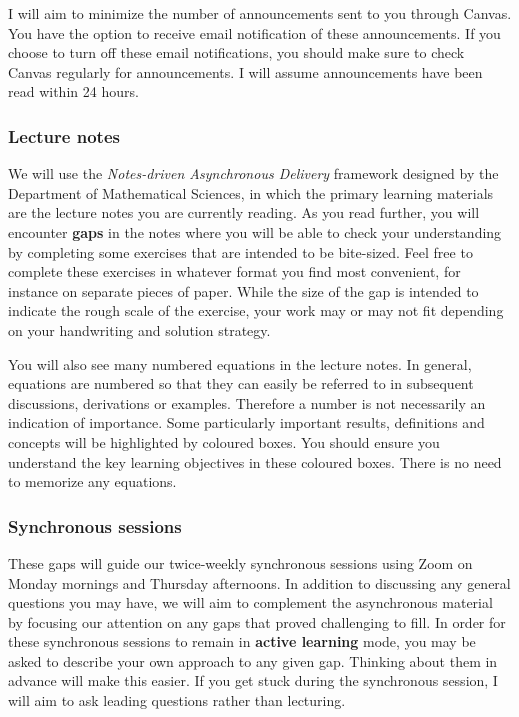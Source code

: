 I will aim to minimize the number of announcements sent to you through Canvas.
You have the option to receive email notification of these announcements.
If you choose to turn off these email notifications, you should make sure to check Canvas regularly for announcements.
I will assume announcements have been read within 24 hours.

\subsubsection*{Lecture notes}
We will use the \textit{Notes-driven Asynchronous Delivery} framework designed by the Department of Mathematical Sciences, in which the primary learning materials are the lecture notes you are currently reading.
As you read further, you will encounter \textbf{gaps} in the notes where you will be able to check your understanding by completing some exercises that are intended to be bite-sized.
Feel free to complete these exercises in whatever format you find most convenient, for instance on separate pieces of paper.
While the size of the gap is intended to indicate the rough scale of the exercise, your work may or may not fit depending on your handwriting and solution strategy.

You will also see many numbered equations in the lecture notes.
In general, equations are numbered so that they can easily be referred to in subsequent discussions, derivations or examples.
Therefore a number is not necessarily an indication of importance.
Some particularly important results, definitions and concepts will be highlighted by coloured boxes.
You should ensure you understand the key learning objectives in these coloured boxes.
There is no need to memorize any equations.

\subsubsection*{Synchronous sessions}
These gaps will guide our twice-weekly synchronous sessions using Zoom on Monday mornings and Thursday afternoons.
In addition to discussing any general questions you may have, we will aim to complement the asynchronous material by focusing our attention on any gaps that proved challenging to fill.
In order for these synchronous sessions to remain in \textbf{active learning} mode, you may be asked to describe your own approach to any given gap.
Thinking about them in advance will make this easier.
If you get stuck during the synchronous session, I will aim to ask leading questions rather than lecturing.

